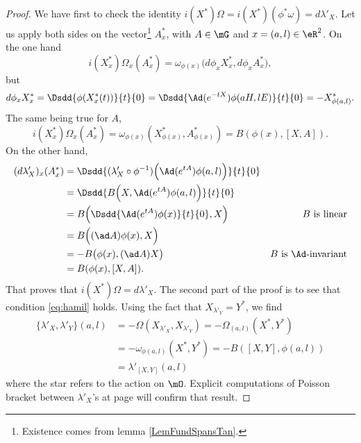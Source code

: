 \begin{proof}
We have first to check the identity $i(X^*)\Omega=i(X^*)(\phi^*\omega)=d\lambda'_X$. Let us apply both sides on the vector\footnote{Existence comes from lemma \ref{LemFundSpansTan}.} $A^*_x$, with $A\in\mG$ and $x=(a,l)\in\eR^2$. On the one hand
\[
  i(X^*_x)\Omega_x(A^*_x)=\omega_{\phi(x)}\big(   d\phi_xX^*_x,d\phi_xA^*_x   \big),
\]
but  
\begin{equation}
  d\phi_xX^*_x=\Dsdd{\phi(X^*_x(t))}{t}{0}
              =\Dsdd{ \Ad(e^{-tX})\phi(aH,lE) }{t}{0}
	      =-X^*_{\phi(a,l)}.
\end{equation}
The same being true for $A$,
\[
  i(X^*_x)\Omega_x(A^*_x)=\omega_{\phi(x)}(X^*_{\phi(x)},A^*_{\phi(x)})=B(\phi(x),[X,A]).
\]
On the other hand,
\begin{equation}
\begin{aligned}
    (d\lambda'_X)_x(A^*_x)&=\Dsdd{ (\lambda'_X\circ\phi^{-1})\Big(   \Ad(e^{tA})\phi(a,l)   \Big) }{t}{0}\\
                         &=\Dsdd{  B\Big(X,\Ad(e^{tA})\phi(a,l) \Big)  }{t}{0} \\
			 &=B\Big(  \Dsdd{\Ad(e^{tA})\phi(x)}{t}{0},X   \Big)    &\text{$B$ is linear}\\
			 &=B\Big(  (\ad A)\phi(x),X   \Big)\\
			 &=-B\big(\phi(x),(\ad A)X\big) &\text{$B$ is $\Ad$-invariant}\\
			 &=B(\phi(x),[X,A]).
\end{aligned}
\end{equation}
That proves that $i(X^*)\Omega=d\lambda'_X$.  The second part of the proof is to see that condition \eqref{eq:hamil} holds.  Using the fact that $X_{\lambda'_Y}=Y^*$, we find
\[ 
\begin{split}
  \{ \lambda'_X,\lambda'_Y \}(a,l)&=-\Omega(X_{\lambda'_X},X_{\lambda'_Y})
		=-\Omega_{(a,l)}(X^*,Y^*)\\
		&=-\omega_{\phi(a,l)}(X^*,Y^*)
		=-B([X,Y],\phi(a,l))\\
		&=\lambda'_{[X,Y]}(a,l)
\end{split}
\]
where the star refers to the action on $\mO$. Explicit computations of Poisson bracket between $\lambda'_X$'s at page \pageref{pg:explic_com_lamb} will confirm that result.

\end{proof}

